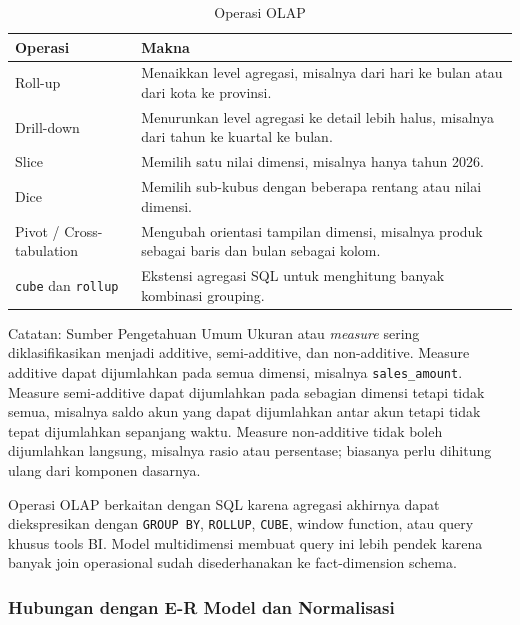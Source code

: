 \begin{table}[H]
\centering
\begin{tabularx}{\textwidth}{|L{0.22\textwidth}|X|}
\hline
\textbf{Operasi} & \textbf{Makna} \\
\hline
Roll-up & Menaikkan level agregasi, misalnya dari hari ke bulan atau dari kota ke provinsi. \\
\hline
Drill-down & Menurunkan level agregasi ke detail lebih halus, misalnya dari tahun ke kuartal ke bulan. \\
\hline
Slice & Memilih satu nilai dimensi, misalnya hanya tahun 2026. \\
\hline
Dice & Memilih sub-kubus dengan beberapa rentang atau nilai dimensi. \\
\hline
Pivot / Cross-tabulation & Mengubah orientasi tampilan dimensi, misalnya produk sebagai baris dan bulan sebagai kolom. \\
\hline
\texttt{cube} dan \texttt{rollup} & Ekstensi agregasi SQL untuk menghitung banyak kombinasi grouping. \\
\hline
\end{tabularx}
\caption{Operasi OLAP}
\label{tab:olap-operations}
\end{table}

\begin{cmt}{Catatan: Sumber Pengetahuan Umum}{}
Ukuran atau \textit{measure} sering diklasifikasikan menjadi additive, semi-additive, dan non-additive. Measure additive dapat dijumlahkan pada semua dimensi, misalnya \texttt{sales\_amount}. Measure semi-additive dapat dijumlahkan pada sebagian dimensi tetapi tidak semua, misalnya saldo akun yang dapat dijumlahkan antar akun tetapi tidak tepat dijumlahkan sepanjang waktu. Measure non-additive tidak boleh dijumlahkan langsung, misalnya rasio atau persentase; biasanya perlu dihitung ulang dari komponen dasarnya.
\end{cmt}

Operasi OLAP berkaitan dengan SQL karena agregasi akhirnya dapat diekspresikan dengan \texttt{GROUP BY}, \texttt{ROLLUP}, \texttt{CUBE}, window function, atau query khusus tools BI. Model multidimensi membuat query ini lebih pendek karena banyak join operasional sudah disederhanakan ke fact-dimension schema.

\subsubsection{Hubungan dengan E-R Model dan Normalisasi}

